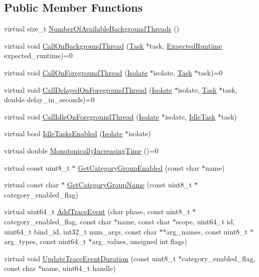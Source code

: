 \subsection*{Public Member Functions}
\begin{DoxyCompactItemize}
\item 
virtual size\+\_\+t \hyperlink{classv8_1_1Platform_a15886ccf5a6a085a2192b305709a527c}{Number\+Of\+Available\+Background\+Threads} ()
\item 
virtual void \hyperlink{classv8_1_1Platform_aa715e6839c1954b4e23b9d2df00bd3ea}{Call\+On\+Background\+Thread} (\hyperlink{classv8_1_1Task}{Task} $\ast$task, \hyperlink{classv8_1_1Platform_ace7f666b2b5995bb0e898e12fa660718}{Expected\+Runtime} expected\+\_\+runtime)=0
\item 
virtual void \hyperlink{classv8_1_1Platform_a8fa13959f919d1d3ff170bceea939915}{Call\+On\+Foreground\+Thread} (\hyperlink{classv8_1_1Isolate}{Isolate} $\ast$isolate, \hyperlink{classv8_1_1Task}{Task} $\ast$task)=0
\item 
virtual void \hyperlink{classv8_1_1Platform_a72bff12d95fbf2118279b0e8f53f8a4b}{Call\+Delayed\+On\+Foreground\+Thread} (\hyperlink{classv8_1_1Isolate}{Isolate} $\ast$isolate, \hyperlink{classv8_1_1Task}{Task} $\ast$task, double delay\+\_\+in\+\_\+seconds)=0
\item 
virtual void \hyperlink{classv8_1_1Platform_ae495999016432391f04d323452084b12}{Call\+Idle\+On\+Foreground\+Thread} (\hyperlink{classv8_1_1Isolate}{Isolate} $\ast$isolate, \hyperlink{classv8_1_1IdleTask}{Idle\+Task} $\ast$task)
\item 
virtual bool \hyperlink{classv8_1_1Platform_ad229642bf16a066d2e8d866dc128141e}{Idle\+Tasks\+Enabled} (\hyperlink{classv8_1_1Isolate}{Isolate} $\ast$isolate)
\item 
virtual double \hyperlink{classv8_1_1Platform_a6d4d7c2dcf6b0c7113099b97fa7f57b7}{Monotonically\+Increasing\+Time} ()=0
\item 
virtual const uint8\+\_\+t $\ast$ \hyperlink{classv8_1_1Platform_a5b81982481986c80d3f613dde54494da}{Get\+Category\+Group\+Enabled} (const char $\ast$name)
\item 
virtual const char $\ast$ \hyperlink{classv8_1_1Platform_a02dde4138b387f1ae2b53190cdac2afc}{Get\+Category\+Group\+Name} (const uint8\+\_\+t $\ast$category\+\_\+enabled\+\_\+flag)
\item 
virtual uint64\+\_\+t \hyperlink{classv8_1_1Platform_ab4ef5713fb5bec0f2fe0981745342364}{Add\+Trace\+Event} (char phase, const uint8\+\_\+t $\ast$category\+\_\+enabled\+\_\+flag, const char $\ast$name, const char $\ast$scope, uint64\+\_\+t id, uint64\+\_\+t bind\+\_\+id, int32\+\_\+t num\+\_\+args, const char $\ast$$\ast$arg\+\_\+names, const uint8\+\_\+t $\ast$arg\+\_\+types, const uint64\+\_\+t $\ast$arg\+\_\+values, unsigned int flags)
\item 
virtual void \hyperlink{classv8_1_1Platform_aa7ead571c0b19687635a930d9c67b73b}{Update\+Trace\+Event\+Duration} (const uint8\+\_\+t $\ast$category\+\_\+enabled\+\_\+flag, const char $\ast$name, uint64\+\_\+t handle)
\end{DoxyCompactItemize}


